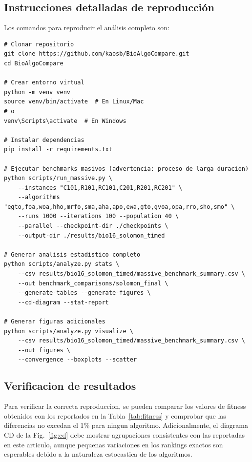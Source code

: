\documentclass[conference,a4paper]{IEEEtran}
\begin{document}
\subsection{Instrucciones detalladas de reproducción}

Los comandos para reproducir el análisis completo son:

\begin{lstlisting}
# Clonar repositorio
git clone https://github.com/kaosb/BioAlgoCompare.git
cd BioAlgoCompare

# Crear entorno virtual
python -m venv venv
source venv/bin/activate  # En Linux/Mac
# o
venv\Scripts\activate  # En Windows

# Instalar dependencias
pip install -r requirements.txt

# Ejecutar benchmarks masivos (advertencia: proceso de larga duracion)
python scripts/run_massive.py \
    --instances "C101,R101,RC101,C201,R201,RC201" \
    --algorithms "egto,foa,woa,hho,mrfo,sma,aha,apo,ewa,gto,gvoa,opa,rro,sho,smo" \
    --runs 1000 --iterations 100 --population 40 \
    --parallel --checkpoint-dir ./checkpoints \
    --output-dir ./results/bio16_solomon_timed

# Generar analisis estadistico completo
python scripts/analyze.py stats \
    --csv results/bio16_solomon_timed/massive_benchmark_summary.csv \
    --out benchmark_comparisons/solomon_final \
    --generate-tables --generate-figures \
    --cd-diagram --stat-report

# Generar figuras adicionales
python scripts/analyze.py visualize \
    --csv results/bio16_solomon_timed/massive_benchmark_summary.csv \
    --out figures \
    --convergence --boxplots --scatter
\end{lstlisting}

\subsection{Verificacion de resultados}

Para verificar la correcta reproduccion, se pueden comparar los valores de fitness obtenidos con los reportados en la Tabla~\ref{tab:fitness} y comprobar que las diferencias no excedan el 1\% para ningun algoritmo. Adicionalmente, el diagrama CD de la Fig.~\ref{fig:cd} debe mostrar agrupaciones consistentes con las reportadas en este articulo, aunque pequenas variaciones en los rankings exactos son esperables debido a la naturaleza estocastica de los algoritmos.

\selectlanguage{english}



\IEEEtriggeratref{45}
\balance
\raggedbottom
\end{document}
